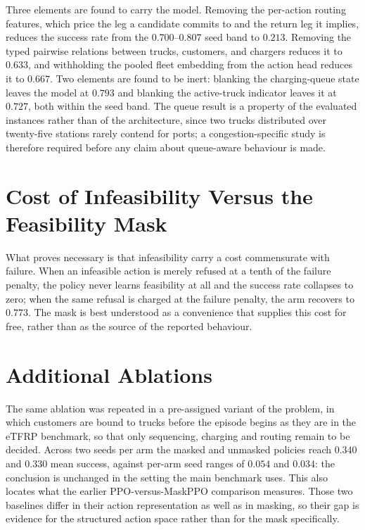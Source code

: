\documentclass[journal]{IEEEtran}
\begin{document}
Three elements are found to carry the model. Removing the per-action routing features, which price the leg a candidate commits to and the return leg it implies, reduces the success rate from the $0.700$--$0.807$ seed band to $0.213$. Removing the typed pairwise relations between trucks, customers, and chargers reduces it to $0.633$, and withholding the pooled fleet embedding from the action head reduces it to $0.667$. Two elements are found to be inert: blanking the charging-queue state leaves the model at $0.793$ and blanking the active-truck indicator leaves it at $0.727$, both within the seed band. The queue result is a property of the evaluated instances rather than of the architecture, since two trucks distributed over twenty-five stations rarely contend for ports; a congestion-specific study is therefore required before any claim about queue-aware behaviour is made.

\section{Cost of Infeasibility Versus the Feasibility Mask}

What proves necessary is that infeasibility carry a cost commensurate with failure. When an infeasible action is merely refused at a tenth of the failure penalty, the policy never learns feasibility at all and the success rate collapses to zero; when the same refusal is charged at the failure penalty, the arm recovers to $0.773$. The mask is best understood as a convenience that supplies this cost for free, rather than as the source of the reported behaviour.
\section{Additional Ablations}

The same ablation was repeated in a pre-assigned variant of the problem, in which customers are bound to
trucks before the episode begins as they are in the eTFRP benchmark, so that only sequencing, charging and routing
remain to be decided. Across two seeds per arm the masked and unmasked policies reach $0.340$ and $0.330$ mean
success, against per-arm seed ranges of $0.054$ and $0.034$: the conclusion is unchanged in the setting the main
benchmark uses. This also locates what the earlier PPO-versus-MaskPPO comparison measures. Those two baselines differ
in their action representation as well as in masking, so their gap is evidence for the structured action space rather
than for the mask specifically.
\end{document}
